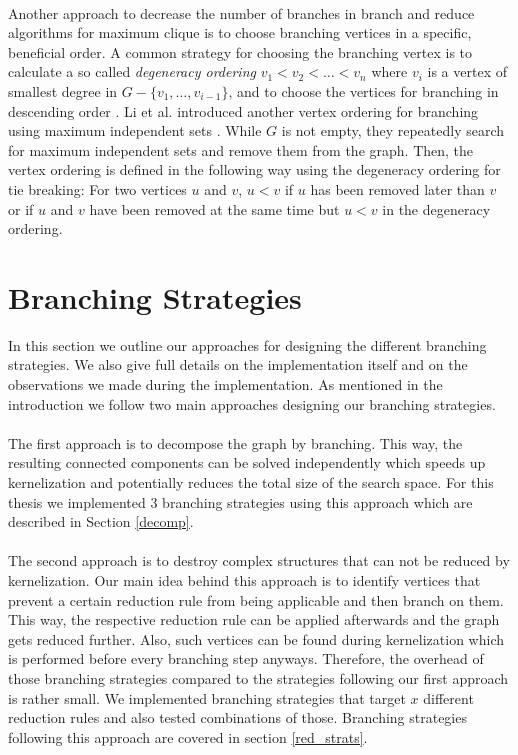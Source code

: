 \documentclass[]{article}
\begin{document}
\paragraph{}
 Another approach to decrease the number of branches in branch and reduce algorithms for maximum clique is to choose branching vertices in a specific, beneficial order. A common strategy for choosing the branching vertex is to calculate a so called \textit{degeneracy ordering} $v_1 < v_2 < \dots < v_n$ where $v_i$ is a vertex of smallest degree in $G - \{v_1, \dots, v_{i-1} \}$, and to choose the vertices for branching in descending order \cite{CarraghanPardalos}. Li et al. introduced another vertex ordering for branching using maximum independent sets \cite{LiFangXu}. While $G$ is not empty, they repeatedly search for maximum independent sets and remove them from the graph. Then, the vertex ordering is defined in the following way using the degeneracy ordering for tie breaking: For two vertices $u$ and $v$, $u < v$ if $u$ has been removed later than $v$ or if $u$ and $v$ have been removed at the same time but $u < v$ in the degeneracy ordering. 

\newpage
\section{Branching Strategies} \label{sec4}
In this section we outline our approaches for designing the different branching strategies. We also give full details on the implementation itself and on the observations we made during the implementation. As mentioned in the introduction we follow two main approaches designing our branching strategies. 
\paragraph{}
The first approach is to decompose the graph by branching. This way, the resulting connected components can be solved independently which speeds up kernelization and potentially reduces the total size of the search space. For this thesis we implemented 3 branching strategies using this approach which are described in Section \ref{decomp}.
\paragraph{}
The second approach is to destroy complex structures that can not be reduced by kernelization. Our main idea behind this approach is to identify vertices that prevent a certain reduction rule from being applicable and then branch on them. This way, the respective reduction rule can be applied afterwards and the graph gets reduced further. Also, such vertices can be found during kernelization which is performed before every branching step anyways. Therefore, the overhead of those branching strategies compared to the strategies following our first approach is rather small. We implemented branching strategies that target $x$ different reduction rules and also tested combinations of those. Branching strategies following this approach are covered in section \ref{red_strats}.
\end{document}
